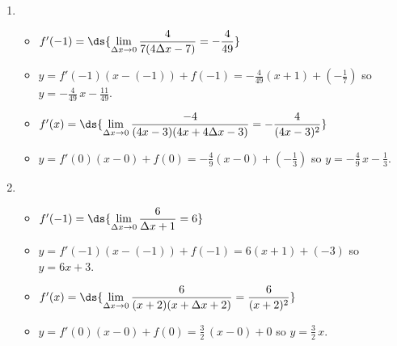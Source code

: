 \documentclass{ximera}
\begin{document}
\begin{enumerate}
\setcounter{enumi}{\value{HW}}

\item \begin{itemize}

\item  $f'(-1) =\ds{ \lim_{\Delta x \rightarrow 0} \dfrac{4}{7(4 \Delta x - 7)} = - \dfrac{4}{49}}$

\smallskip

\item $y = f'(-1)(x-(-1)) + f(-1) = -\frac{4}{49}(x + 1) + \left(-\frac{1}{7}\right)$ so $y = -\frac{4}{49} \, x - \frac{11}{49}$.   

\smallskip

\item  $f'(x) = \ds{ \lim_{\Delta x \rightarrow 0} \dfrac{-4}{(4x-3)(4x+4\Delta x-3)} =  - \dfrac{4}{(4x-3)^2}}$  

\smallskip

\item $y = f'(0)(x-0)+f(0) = -\frac{4}{9} (x-0) + \left(-\frac{1}{3}\right)$ so $y = -\frac{4}{9} \, x - \frac{1}{3}$.

\smallskip

\end{itemize}
   
\item \begin{itemize}

\item  $f'(-1) = \ds{ \lim_{\Delta x \rightarrow 0} \dfrac{6}{\Delta x + 1}= 6}$

\smallskip

\item $y = f'(-1)(x-(-1)) + f(-1) = 6(x+1) + (-3)$ so $y = 6x+3$.

\smallskip

\item  $f'(x) =\ds{ \lim_{\Delta x \rightarrow 0} \dfrac{6}{(x+2)(x+\Delta x+2)} =   \dfrac{6}{(x+2)^2}}$ 

\smallskip    

\item  $y = f'(0)(x-0) + f(0) = \frac{3}{2} \, (x-0)+0$ so $y = \frac{3}{2} \, x$.


\smallskip


\end{itemize}

 
\setcounter{HW}{\value{enumi}}
\end{enumerate}
\end{document}
